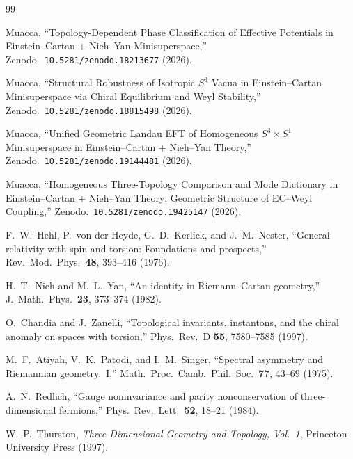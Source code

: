 \documentclass[12pt,a4paper]{article}
\theoremstyle{definition}
\theoremstyle{remark}
\newcommand{\Sthree}{S^3}
\newcommand{\Sone}{S^1}
\begin{document}
\begin{thebibliography}{99}

Muacca,
``Topology-Dependent Phase Classification of Effective Potentials
in Einstein--Cartan + Nieh--Yan Minisuperspace,''
Zenodo.\ \texttt{10.5281/zenodo.18213677} (2026).

Muacca,
``Structural Robustness of Isotropic $\Sthree$ Vacua in Einstein--Cartan
Minisuperspace via Chiral Equilibrium and Weyl Stability,''
Zenodo.\ \texttt{10.5281/zenodo.18815498} (2026).

Muacca,
``Unified Geometric Landau EFT of Homogeneous $\Sthree\times\Sone$
Minisuperspace in Einstein--Cartan + Nieh--Yan Theory,''
Zenodo.\ \texttt{10.5281/zenodo.19144481} (2026).

Muacca,
``Homogeneous Three-Topology Comparison and Mode Dictionary
in Einstein--Cartan + Nieh--Yan Theory: Geometric Structure of EC--Weyl Coupling,''
Zenodo.\ \texttt{10.5281/zenodo.19425147} (2026).

F.~W.~Hehl, P.~von der Heyde, G.~D.~Kerlick, and J.~M.~Nester,
``General relativity with spin and torsion: Foundations and prospects,''
Rev.\ Mod.\ Phys.\ \textbf{48}, 393--416 (1976).

H.~T.~Nieh and M.~L.~Yan,
``An identity in Riemann--Cartan geometry,''
J.\ Math.\ Phys.\ \textbf{23}, 373--374 (1982).

O.~Chandia and J.~Zanelli,
``Topological invariants, instantons, and the chiral anomaly on spaces
with torsion,''
Phys.\ Rev.\ D \textbf{55}, 7580--7585 (1997).

M.~F.~Atiyah, V.~K.~Patodi, and I.~M.~Singer,
``Spectral asymmetry and Riemannian geometry.~I,''
Math.\ Proc.\ Camb.\ Phil.\ Soc.\ \textbf{77}, 43--69 (1975).

A.~N.~Redlich,
``Gauge noninvariance and parity nonconservation of three-dimensional fermions,''
Phys.\ Rev.\ Lett.\ \textbf{52}, 18--21 (1984).

W.~P.~Thurston,
\emph{Three-Dimensional Geometry and Topology, Vol.~1},
Princeton University Press (1997).

\end{thebibliography}

\end{document}
